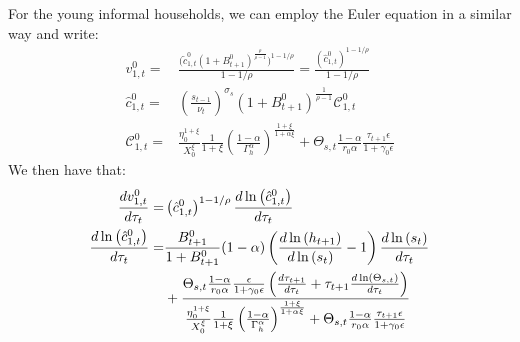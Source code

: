 For the young informal households, we can employ the Euler equation in a similar way and write:
\begin{align*}
    v_{1,t}^0 =& \frac{\Big(\tilde{c}_{1,t}^0(1+B_{t+1}^0)^{\frac{\rho}{\rho-1}}\Big)^{1-1/\rho}}{1-1/\rho} = \frac{\left(\hat{c}_{1,t}^0\right)^{1-1/\rho}}{1-1/\rho} \\
    \hat{c}_{1,t}^0 =& \left(\frac{s_{t-1}}{\nu_t}\right)^{\sigma_s}(1+B_{t+1}^0)^{\frac{1}{\rho-1}}\mathcal{C}_{1,t}^0 \\ 
    \mathcal{C}_{1,t}^0 =& \frac{\eta_{0}^{1+\xi}}{X_{0}^{\xi}}\frac{1}{1+\xi}\left(\frac{1-\alpha}{\Gamma_{h}^{\alpha}}\right)^{\frac{1+\xi}{1+\alpha\xi}}+\Theta_{s,t}\frac{1-\alpha}{r_0\alpha}\frac{\tau_{t+1}\epsilon}{1+\gamma_0\epsilon}
\end{align*}
We then have that:
\begin{align}
    \frac{dv_{1,t}^0}{d\tau_t}=& \left(\hat{c}_{1,t}^0\right)^{1-1/\rho} \frac{d\ln\left(\hat{c}_{1,t}^0\right)}{d\tau_t} \\
    \frac{d\ln\left(\hat{c}_{1,t}^0\right)}{d\tau_t} =& \frac{B_{t+1}^0}{1+B_{t+1}^0}(1-\alpha)\left(\frac{d\ln\left(h_{t+1}\right)}{d\ln\left(s_t\right)}-1\right)\frac{d\ln\left(s_t\right)}{d\tau_t} \notag\\
    &+\frac{\Theta_{s,t}\frac{1-\alpha}{r_0\alpha}\frac{\epsilon}{1+\gamma_0\epsilon}\left(\frac{d\tau_{t+1}}{d\tau_t}+\tau_{t+1}\frac{d\ln\left(\Theta_{s,t}\right)}{d\tau_t}\right)}{\frac{\eta_{0}^{1+\xi}}{X_{0}^{\xi}}\frac{1}{1+\xi}\left(\frac{1-\alpha}{\Gamma_{h}^{\alpha}}\right)^{\frac{1+\xi}{1+\alpha\xi}}+\Theta_{s,t}\frac{1-\alpha}{r_0\alpha}\frac{\tau_{t+1}\epsilon}{1+\gamma_0\epsilon}} 
\end{align}
